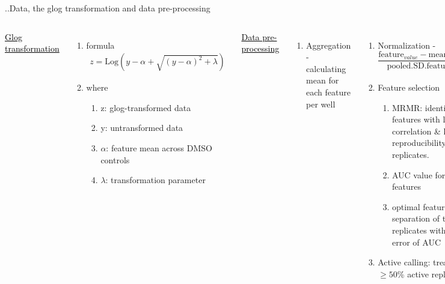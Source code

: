 \documentclass[11pt]{beamer}
\begin{document}
\begin{frame}{..Data, the glog transformation and data pre-processing}
       \begin{columns}
             \textcolor{black}{\underline{Glog transformation }}
\begin{enumerate}[$\Rsh$]
\item formula\\
\begin{equation*}
\begin{split}
z=\mbox{Log}(y-\alpha+\sqrt{(y-\alpha)^2+\lambda})
\end{split}
\end{equation*}
\item where
\begin{enumerate}[$\bullet$]
\item z: glog-transformed data
\item y: untransformed data
\item $\alpha$: feature mean across DMSO controls
\item $\lambda$: transformation parameter
\end{enumerate}
\end{enumerate}
             \textcolor{black}{\underline{Data pre-processing}}
             \begin{enumerate}[$\Rsh$]
\item Aggregation - calculating mean for each feature per well
\end{enumerate}
\begin{enumerate}[$\Rsh$]
\item Normalization - 
$$\frac{\mbox{feature}_{value}-\mbox{mean.feature}_{DMSO}}{\mbox{pooled.SD.feature}_{across.plates}}$$
\item Feature selection 
\begin{enumerate}[$\bullet$]
\item MRMR: identify set of features with low pairwise correlation \& high reproducibility among replicates.
\item AUC value for btwn 2-75 features
\item optimal feature: maximizes separation of treatment replicates within 1 Std error of AUC
\end{enumerate}
\item Active calling: treatments with $\ge 50$\% active replicates
\end{enumerate}
 \end{columns}
\end{frame}
\end{document}
